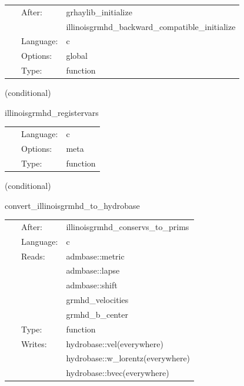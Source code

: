 \hspace{5mm}{\it validate supported entropy contracts and install stable simple thermodynamics } 


\hspace{5mm}

 \begin{tabular*}{160mm}{cll} 
~ & After:  & grhaylib\_initialize \\ 
~& ~ &illinoisgrmhd\_backward\_compatible\_initialize\\ 
~ & Language:  & c \\ 
~ & Options:  & global \\ 
~ & Type:  & function \\ 
\end{tabular*} 


\vspace{5mm}

   (conditional) 

\hspace{5mm} illinoisgrmhd\_registervars 

\hspace{5mm}{\it register evolved, rhs variables in illinoisgrmhd for mol } 


\hspace{5mm}

 \begin{tabular*}{160mm}{cll} 
~ & Language:  & c \\ 
~ & Options:  & meta \\ 
~ & Type:  & function \\ 
\end{tabular*} 


\vspace{5mm}

   (conditional) 

\hspace{5mm} convert\_illinoisgrmhd\_to\_hydrobase 

\hspace{5mm}{\it convert illinoisgrmhd-native variables to hydrobase } 


\hspace{5mm}

 \begin{tabular*}{160mm}{cll} 
~ & After:  & illinoisgrmhd\_conservs\_to\_prims \\ 
~ & Language:  & c \\ 
~ & Reads:  & admbase::metric \\ 
~& ~ &admbase::lapse\\ 
~& ~ &admbase::shift\\ 
~& ~ &grmhd\_velocities\\ 
~& ~ &grmhd\_b\_center\\ 
~ & Type:  & function \\ 
~ & Writes:  & hydrobase::vel(everywhere) \\ 
~& ~ &hydrobase::w\_lorentz(everywhere)\\ 
~& ~ &hydrobase::bvec(everywhere)\\ 
\end{tabular*} 


